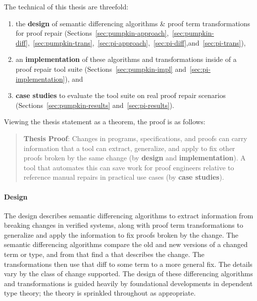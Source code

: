 The technical  of this thesis are threefold:

\begin{enumerate}
\item the \textbf{design} of semantic differencing algorithms \& proof term transformations for proof repair (Sections~\ref{sec:pumpkin-approach},~\ref{sec:pumpkin-diff},~\ref{sec:pumpkin-trans},~\ref{sec:pi-approach},~\ref{sec:pi-diff},and~\ref{sec:pi-trans}),
\item an \textbf{implementation} of these algorithms and transformations inside of a proof repair tool suite (Sections~\ref{sec:pumpkin-impl} and~\ref{sec:pi-implementation}), and
\item \textbf{case studies} to evaluate the tool suite on real proof repair scenarios (Sections~\ref{sec:pumpkin-results} and~\ref{sec:pi-results}).
\end{enumerate}
Viewing the thesis statement as a theorem, the proof is as follows: %

\begin{quote}
\textbf{Thesis Proof}: Changes in programs, specifications, and proofs can carry information that a tool can extract, generalize, and apply to fix other proofs broken by the same change (by \textbf{design} and \textbf{implementation}). A tool that automates this can save work for proof engineers relative to reference manual repairs in practical use cases (by \textbf{case studies}).
\end{quote}

\paragraph{Design}
The design describes semantic differencing algorithms to extract information from breaking changes in verified systems,
along with proof term transformations to generalize and apply the information to fix proofs broken by the change.
The semantic differencing algorithms compare the old and new versions of a changed term or type,
and from that find a  that describes the change.
The transformations then use that diff to  some term to a more general fix.
The details vary by the class of change supported.
The design of these differencing algorithms and transformations is guided heavily by foundational developments in dependent type theory;
the theory is sprinkled throughout as appropriate.


